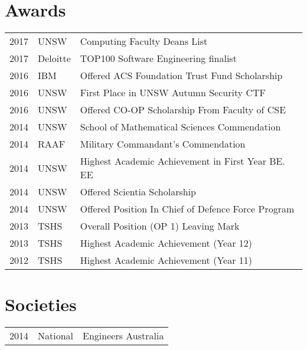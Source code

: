 \documentclass[letterpaper]{deedy-resume} %
\begin{document}
\begin{minipage}[t]{0.60\textwidth}
\section{Awards} 

\begin{tabular}{rll}
2017 & UNSW & Computing Faculty Deans List \\
2017 & Deloitte & TOP100 Software Engineering finalist \\
2016 & IBM &  Offered ACS Foundation Trust Fund Scholarship \\
2016 & UNSW & First Place in UNSW Autumn Security CTF \\
2016 & UNSW & Offered CO-OP Scholarship From Faculty of CSE\\
2014 & UNSW & School of Mathematical Sciences Commendation\\
2014 & RAAF & Military Commandant's Commendation\\
2014 & UNSW & Highest Academic Achievement in First Year BE. EE\\
2014 & UNSW & Offered Scientia Scholarship\\
2014 & UNSW & Offered Position In Chief of Defence Force Program\\
2013	& TSHS & Overall Position (OP 1) Leaving Mark\\
2013 & TSHS & Highest Academic Achievement (Year 12)\\
2012 & TSHS & Highest Academic Achievement (Year 11)\\
\end{tabular}

\sectionspace %


\section{Societies} 

\begin{tabular}{rll}
2014 & National & Engineers Australia\\
\end{tabular}



\end{minipage} %
\end{document}
